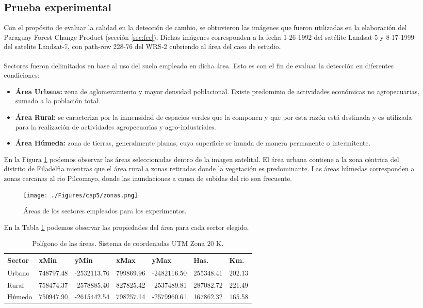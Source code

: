 \subsection{Prueba experimental} 
Con el prop\'osito de evaluar la calidad en la detecci\'on de cambio, se obtuvieron las im\'agenes que fueron utilizadas en la elaboraci\'on del Paraguay Forest Change Product (secci\'on \ref{sec:fcc}). Dichas im\'agenes corresponden a la fecha 1-26-1992	del sat\'elite Landsat-5 y 8-17-1999 del satelite Landsat-7, con path-row 228-76 del WRS-2 cubriendo al \'area del caso de estudio.\\~\\
Sectores fueron delimitados en base al uso del suelo empleado en dicha \'area. Esto es con el fin de evaluar la detecci\'on en diferentes condiciones:
\begin{itemize}
	\item \textbf{\'Area Urbana:} zona de aglomeramiento y mayor densidad poblacional. Existe predominio  de actividades econ\'omicas no agropecuarias, sumado a la poblaci\'on total. 
	\item \textbf{\'Area Rural:} se caracteriza por la inmensidad de espacios verdes que la componen y que por esta razón est\'a destinada y es utilizada para la realizaci\'on de actividades agropecuarias y agro-industriales.
	\item \textbf{\'Area H\'umeda:}	zona de tierras, generalmente planas, cuya superficie se inunda de manera permanente o intermitente.
\end{itemize}
En la Figura \ref{fig:zonasEva} podemos observar las \'areas seleccionadas dentro de la imagen satelital. El \'area urbana contiene a la zona c\'entrica del distrito de Filadelfia mientras que el \'area rural a zonas retiradas donde la vegetaci\'on es predominante. Las \'areas h\'umedas corresponden a zonas cercanas al rio Pilcomayo, donde las inundaciones a causa de subidas del rio son frecuente.   
\begin{figure}[H]
	\centering
	\texttt{[image: ./Figures/cap5/zonas.png]}
	\caption{\'Areas de los sectores empleados para los experimentos.}
	\label{fig:zonasEva}
\end{figure}
En la Tabla \ref{t:poligonos} podemos observar las propiedades del \'area para cada sector elegido.
\begin{table}[H]
	\centering
	\begin{tabular}{|l|l|l|l|l|l|l|}
		\hline
		\rowcolor[HTML]{EFEFEF} 
		\textbf{Sector} & \textbf{xMin} & \textbf{yMin} & \textbf{xMax} & \textbf{yMax} & \textbf{Has.} & \textbf{Km.} \\ \hline
		Urbano          & 748797.48     & -2532113.76   & 799869.96     & -2482116.50 & 255348.41 & 202.13   \\ \hline
		Rural           & 758474.37     & -2578885.40   & 827825.42     & -2537489.81 & 287082.72 & 221.49  \\ \hline
		Húmedo          & 750947.90     & -2615442.54   & 798257.14     & -2579960.61 & 167862.32 & 165.58	  \\ \hline
	\end{tabular}
		\caption{Pol\'igono de las \'areas. Sistema de coordenadas UTM Zona 20 K. }
		\label{t:poligonos}
\end{table}
